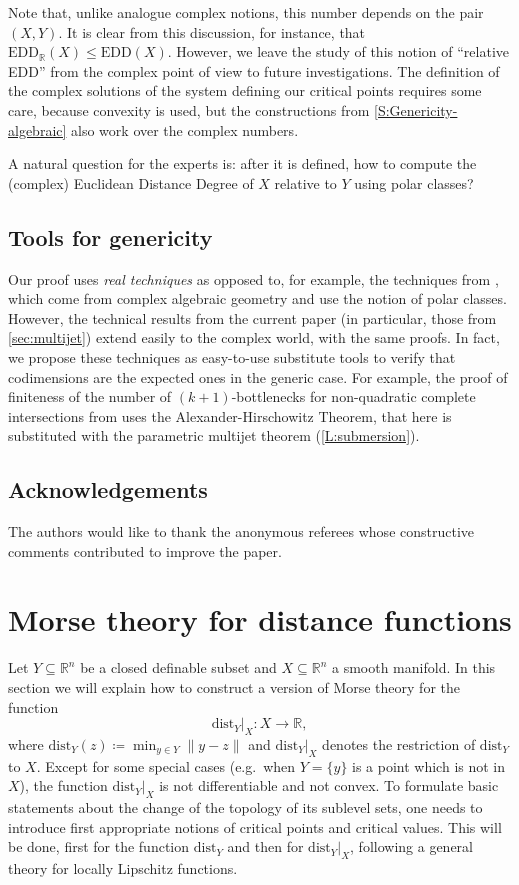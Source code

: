 \documentclass{amsart}
\newcommand{\R}{\mathbb{R}}
\newcommand{\dd}{\mathrm{dist}}
\newcommand{\dist}{{\mathrm{dist}_Y|_X}}
\theoremstyle{definition}
\theoremstyle{remark}
\begin{document}
Note that, unlike analogue complex notions, this number depends on the pair $(X, Y)$.
It is clear from this discussion, for instance, that $\mathrm{EDD}_\mathbb{R}(X)\leq \mathrm{EDD}(X).$
However, we leave the study of this notion of ``relative EDD'' from the complex point of view to future investigations. The definition of the complex solutions of the system defining our critical points requires some care, because convexity is used, but the constructions from \cref{S:Genericity-algebraic} also work over the complex numbers. 

A natural question for the experts is: after it is defined, how to compute the (complex) Euclidean Distance Degree of $X$ relative to $Y$ using polar classes?

\subsection{Tools for genericity}
Our proof uses \emph{real techniques} as opposed to, for example, the techniques from \cite{DiRocco_Eklund_Weinstein}, which come from complex algebraic geometry and use the notion of polar classes. However, the technical results from the current paper (in particular, those from \cref{sec:multijet}) extend easily to the complex world, with the same proofs. In fact, we propose these techniques as easy-to-use substitute tools to verify that codimensions are the expected ones in the generic case. For example, the proof of finiteness of the number of $(k+1)$-bottlenecks for non-quadratic complete intersections from  \cite[Theorem 4.14]{DEEGH2023} uses the Alexander-Hirschowitz Theorem, that here is substituted with the parametric multijet theorem (\cref{L:submersion}).

\subsection*{Acknowledgements}
The authors would like to thank the anonymous referees whose constructive comments contributed to improve the paper.






\section{Morse theory for distance functions}
\label{S:Morse}

Let $Y\subseteq \R^n$ be a closed definable subset and $X\subseteq \R^n$ a smooth manifold. In this section we will explain how to construct a version of Morse theory for the function 
\[\dist \colon X \to \R,
\]
where $\dd_Y(z) \coloneqq \min_{y\in Y} \| y - z \|$ and $\dist$ denotes the restriction of $\dd_Y$ to $X$. 
Except for some special cases (e.g.\ when $Y=\{y\}$ is a point which is not in $X$), the function $\dist$ is not differentiable and not convex. To formulate basic statements about the change of the topology of its  sublevel sets, one needs to introduce first appropriate notions of critical points and critical values. 
This will be done, first for the function $\dd_Y$ and then for $\dist$, following a  general theory for locally Lipschitz functions. 
\end{document}

